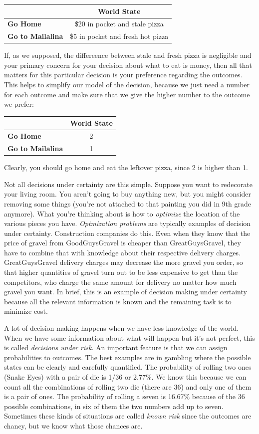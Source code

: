 \documentclass[]{tufte-book}
\begin{document}
\begin{longtable}[]{@{}lc@{}}
\toprule
& World State\tabularnewline
\midrule
\endhead
\textbf{Go Home} & \$20 in pocket and stale pizza\tabularnewline
\textbf{Go to Mailalina} & \$5 in pocket and fresh hot pizza\tabularnewline
\bottomrule
\end{longtable}

If, as we supposed, the differeence between stale and fresh pizza is negligible and your primary concern for your decision about what to eat is money, then all that matters for this particular decision is your preference regarding the outcomes. This helps to simplify our model of the decision, because we just need a number for each outcome and make sure that we give the higher number to the outcome we prefer:

\begin{longtable}[]{@{}lc@{}}
\toprule
& World State\tabularnewline
\midrule
\endhead
\textbf{Go Home} & 2\tabularnewline
\textbf{Go to Mailalina} & 1\tabularnewline
\bottomrule
\end{longtable}

Clearly, you should go home and eat the leftover pizza, since 2 is higher than 1.

Not all decisions under certainty are this simple. Suppose you want to redecorate your living room. You aren't going to buy anything new, but you might consider removing some things (you're not attached to that painting you did in 9th grade anymore). What you're thinking about is how to \emph{optimize} the location of the various pieces you have. \emph{Optmization problems} are typically examples of decision under certainty. Construction companies do this. Even when they know that the price of gravel from GoodGuysGravel is cheaper than GreatGuysGravel, they have to combine that with knowledge about their respective delivery charges. GreatGuysGravel delivery charges may decrease the more gravel you order, so that higher quantities of gravel turn out to be less expensive to get than the competitors, who charge the same amount for delivery no matter how much gravel you want. In brief, this is an example of decision making under certainty because all the relevant information is known and the remaining task is to minimize cost.

A lot of decision making happens when we have less knowledge of the world. When we have some information about what will happen but it's not perfect, this is called \emph{decisions under risk}. An important feature is that we can assign probabilities to outcomes. The best examples are in gambling where the possible states can be clearly and carefully quantified. The probability of rolling two ones (Snake Eyes) with a pair of die is 1/36 or 2.77\%. We know this because we can count all the combinations of rolling two die (there are 36) and only one of them is a pair of ones. The probability of rolling a seven is 16.67\% because of the 36 possible combinations, in six of them the two numbers add up to seven. Sometimes these kinds of situations are called \emph{known risk} since the outcomes are chancy, but we know what those chances are.
\end{document}
